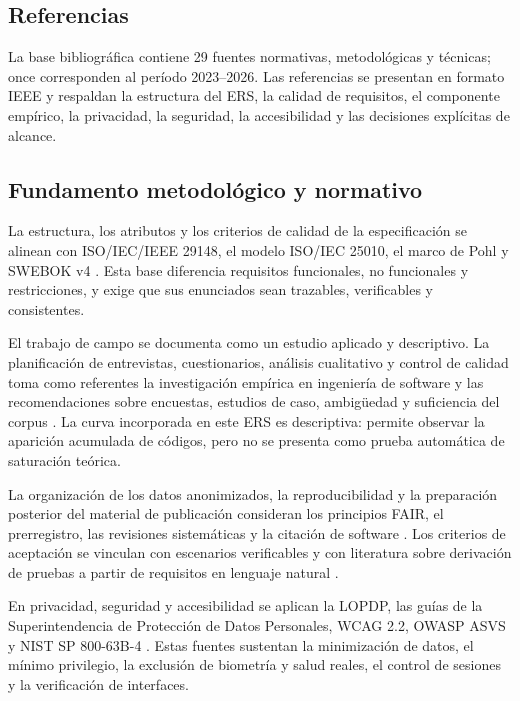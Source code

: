 \documentclass[11pt,a4paper,twoside]{article}
\begin{document}
\subsection{Referencias}
La base bibliográfica contiene 29 fuentes normativas, metodológicas y técnicas; once corresponden al período 2023--2026. Las referencias se presentan en formato IEEE y respaldan la estructura del ERS, la calidad de requisitos, el componente empírico, la privacidad, la seguridad, la accesibilidad y las decisiones explícitas de alcance.

\subsection{Fundamento metodológico y normativo}
La estructura, los atributos y los criterios de calidad de la especificación se alinean con ISO/IEC/IEEE 29148, el modelo ISO/IEC 25010, el marco de Pohl y SWEBOK v4 \cite{iso29148,iso25010,pohl2010,swebok2024,montgomery2022}. Esta base diferencia requisitos funcionales, no funcionales y restricciones, y exige que sus enunciados sean trazables, verificables y consistentes.

El trabajo de campo se documenta como un estudio aplicado y descriptivo. La planificación de entrevistas, cuestionarios, análisis cualitativo y control de calidad toma como referentes la investigación empírica en ingeniería de software y las recomendaciones sobre encuestas, estudios de caso, ambigüedad y suficiencia del corpus \cite{runeson2009,wohlin2012,molleri2020,ferrari2016,hennink2017,hagaman2017,guest2006}. La curva incorporada en este ERS es descriptiva: permite observar la aparición acumulada de códigos, pero no se presenta como prueba automática de saturación teórica.

La organización de los datos anonimizados, la reproducibilidad y la preparación posterior del material de publicación consideran los principios FAIR, el prerregistro, las revisiones sistemáticas y la citación de software \cite{wilkinson2016,nosek2018,kitchenham2007,smith2016}. Los criterios de aceptación se vinculan con escenarios verificables y con literatura sobre derivación de pruebas a partir de requisitos en lenguaje natural \cite{fischbach2023}.

En privacidad, seguridad y accesibilidad se aplican la LOPDP, las guías de la Superintendencia de Protección de Datos Personales, WCAG 2.2, OWASP ASVS y NIST SP 800-63B-4 \cite{lopdp2021,spdp2025,spdp2026,wcag2024,owasp2025,nist2025}. Estas fuentes sustentan la minimización de datos, el mínimo privilegio, la exclusión de biometría y salud reales, el control de sesiones y la verificación de interfaces.
\end{document}
